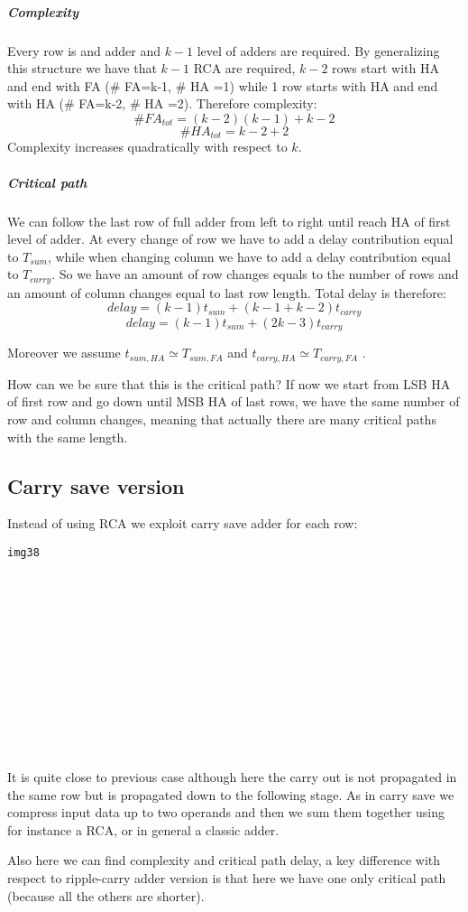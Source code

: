 \subparagraph{Complexity}
Every row is and adder and $k-1$ level of adders are required. By generalizing this structure we have that $k-1$ RCA are required, $k-2$ rows start with HA and end with FA (\# FA=k-1, \# HA =1) while 1 row starts with HA and end with HA (\# FA=k-2, \# HA =2). Therefore complexity:
$$  \#FA_{tot} = (k-2)(k-1)+k-2$$
$$  \#HA_{tot} = k-2+2$$
Complexity increases quadratically with respect to $k$.

\subparagraph{Critical path}
We can follow the last row of full adder from left to right until reach HA of first level of adder. At every change of row we have to add a delay contribution equal to $T_{sum}$, while when changing column we have to add a delay contribution equal to $T_{carry}$. So we have an amount of row changes equals to the number of rows and an amount of column changes equal to last row length. Total delay is therefore:
$$delay=(k-1)t_{sum}+(k-1+k-2)t_{carry}$$
$$delay=(k-1)t_{sum}+(2k-3)t_{carry}$$

Moreover we assume $t_{sum, HA} \simeq T_{sum, FA}$ and $t_{carry, HA} \simeq T_{carry, FA}$ .

How can we be sure that this is the critical path? If now we start from LSB HA of first row and go down until MSB HA of last rows, we have the same number of row and column changes, meaning that actually there are many critical paths with the same length.

\subsection{Carry save version}
Instead of using RCA we exploit carry save adder for each row:
\begin{verbatim}
img38














\end{verbatim}

It is quite close to previous case although here the carry out is not propagated in the same row but is propagated down to the following stage. As in carry save we compress input data up to two operands and then we sum them together using for instance a RCA, or in general a classic adder.

Also here we can find complexity and critical path delay, a key difference with respect to ripple-carry adder version is that here we have one only critical path (because all the others are shorter).

